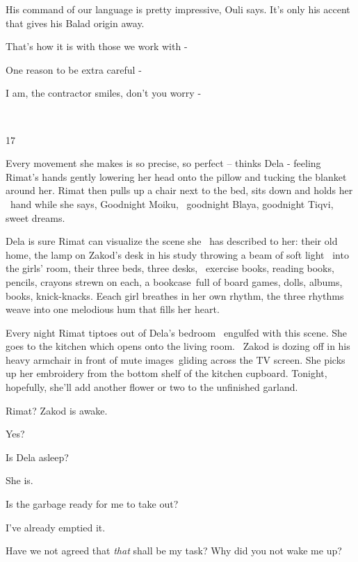 \documentclass[letterpaper]{article}
\begin{document}
{\textquotedbl}His command of our language is pretty impressive,{\textquotedbl} Ouli says. {\textquotedbl}It's only his
accent that gives his Balad origin away.{\textquotedbl}

{\textquotedbl}That's how it is with those we work with -{\textquotedbl}

{\textquotedbl}One reason to be extra careful -{\textquotedbl}

{\textquotedbl}I am,{\textquotedbl} the contractor smiles, {\textquotedbl}don't you worry -{\textquotedbl}

~

17

Every movement she makes is so precise, so perfect -- thinks Dela - feeling Rimat's hands gently lowering her head onto
the pillow and tucking the blanket around her. Rimat then pulls up a chair next to the bed, sits down and holds her
\ hand while she says, {\textquotedbl}Goodnight Moiku, ~goodnight Blaya, goodnight Tiqvi, sweet dreams.{\textquotedbl} 

Dela is sure Rimat can visualize the scene she \ has described to her: their old home, the lamp on Zakod's desk in his
study throwing a beam of soft light \ into the girls' room, their three beds, three desks, \ exercise books, reading
books, pencils, crayons strewn on each, a bookcase~full of board games, dolls, albums, books, knick-knacks. Eeach girl
breathes in her own rhythm, the three rhythms weave into one melodious hum that fills her heart. 

Every night Rimat tiptoes out of Dela's bedroom \ engulfed with this scene. She goes to the kitchen which opens onto the
living room. \ Zakod is dozing off in his heavy armchair in front of mute images~gliding across the TV screen. She
picks up her embroidery from the bottom shelf of the kitchen cupboard. Tonight, hopefully, she'll add another flower or
two to the unfinished garland.

{\textquotedbl}Rimat?{\textquotedbl} Zakod is awake. 

{\textquotedbl}Yes?{\textquotedbl}

{\textquotedbl}Is Dela asleep?{\textquotedbl} 

{\textquotedbl}She is.{\textquotedbl} 

{\textquotedbl}Is the garbage ready for me to take out?{\textquotedbl} 

{\textquotedbl}I've already emptied it.{\textquotedbl} 

{\textquotedbl}Have we not agreed that \textit{that} shall be my task? Why did you not wake me up?{\textquotedbl} 
\end{document}
